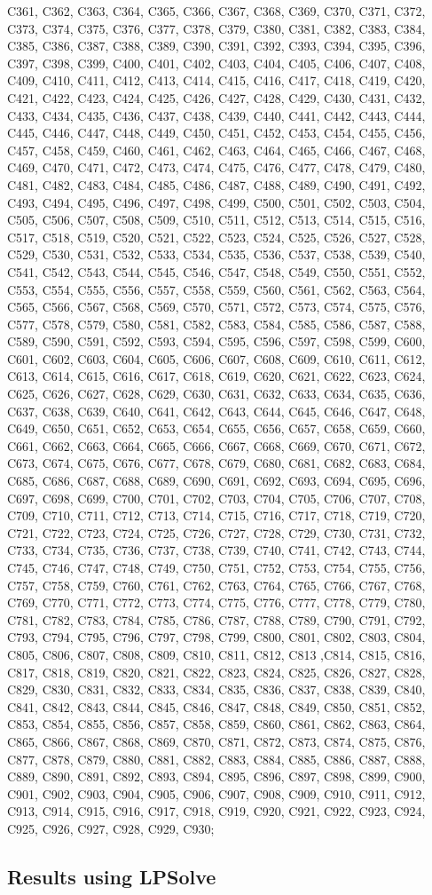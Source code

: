C361, C362, C363, C364, C365, C366, C367, C368, C369, C370, C371, C372, C373, C374, C375, C376, C377, C378, C379, C380, C381, C382, C383, C384, C385, C386, C387, C388, C389, C390, C391, C392, C393, C394, C395, C396, C397, C398, C399, C400, C401, C402, C403, C404, C405, C406, C407, C408, C409, C410, C411, C412, C413, C414, C415, C416, C417, C418, C419, C420, C421, C422, C423, C424, C425, C426, C427, C428, C429, C430, C431, C432, C433, C434, C435, C436, C437, C438, C439, C440, C441, C442, C443, C444, C445, C446, C447, C448, C449, C450, C451, C452, C453, C454, C455, C456, C457, C458, C459, C460, C461, C462, C463, C464, C465, C466, C467, C468, C469, C470, C471, C472, C473, C474, C475, C476, C477, C478, C479, C480, C481, C482, C483, C484, C485, C486, C487, C488, C489, C490, C491, C492, C493, C494, C495, C496, C497, C498, C499, C500, C501, C502, C503, C504, C505, C506, C507, C508, C509, C510, C511, C512, C513, C514, C515, C516, C517, C518, C519, C520, C521, C522, C523, C524, C525, C526, C527, C528, C529, C530, C531, C532, C533, C534, C535, C536, C537, C538, C539, C540, C541, C542, C543, C544, C545, C546, C547, C548, C549, C550, C551, C552, C553, C554, C555, C556, C557, C558, C559, C560, C561, C562, C563, C564, C565, C566, C567, C568, C569, C570, C571, C572, C573, C574, C575, C576, C577, C578, C579, C580, C581, C582, C583, C584, C585, C586, C587, C588, C589, C590, C591, C592, C593, C594, C595, C596, C597, C598, C599, C600, C601, C602, C603, C604, C605, C606, C607, C608, C609, C610, C611, C612, C613, C614, C615, C616, C617, C618, C619, C620, C621, C622, C623, C624, C625, C626, C627, C628, C629, C630, C631, C632, C633, C634, C635, C636, C637, C638, C639, C640, C641, C642, C643, C644, C645, C646, C647, C648, C649, C650, C651, C652, C653, C654, C655, C656, C657, C658, C659, C660, C661, C662, C663, C664, C665, C666, C667, C668, C669, C670, C671, C672, C673, C674, C675, C676, C677, C678, C679, C680, C681, C682, C683, C684, C685, C686, C687, C688, C689, C690, C691, C692, C693, C694, C695, C696, C697, C698, C699, C700, C701, C702, C703, C704, C705, C706, C707, C708, C709, C710, C711, C712, C713, C714, C715, C716, C717, C718, C719, C720, C721, C722, C723, C724, C725, C726, C727, C728, C729, C730, C731, C732, C733, C734, C735, C736, C737, C738, C739, C740, C741, C742, C743, C744, C745, C746, C747, C748, C749, C750, C751, C752, C753, C754, C755, C756, C757, C758, C759, C760, C761, C762, C763, C764, C765, C766, C767, C768, C769, C770, C771, C772, C773, C774, C775, C776, C777, C778, C779, C780, C781, C782, C783, C784, C785, C786, C787, C788, C789, C790, C791, C792, C793, C794, C795, C796, C797, C798, C799, C800, C801, C802, C803, C804, C805, C806, C807, C808, C809, C810, C811, C812, C813 ,C814, C815, C816, C817, C818, C819, C820, C821, C822, C823, C824, C825, C826, C827, C828, C829, C830, C831, C832, C833, C834, C835, C836, C837, C838, C839, C840, C841, C842, C843, C844, C845, C846, C847, C848, C849, C850, C851, C852, C853, C854, C855, C856, C857, C858, C859, C860, C861, C862, C863, C864, C865, C866, C867, C868, C869, C870, C871, C872, C873, C874, C875, C876, C877, C878, C879, C880, C881, C882, C883, C884, C885, C886, C887, C888, C889, C890, C891, C892, C893, C894, C895, C896, C897, C898, C899, C900, C901, C902, C903, C904, C905, C906, C907, C908, C909, C910, C911, C912, C913, C914, C915, C916, C917, C918, C919, C920, C921, C922, C923, C924, C925, C926, C927, C928, C929, C930; \\


\subsection{Results using LPSolve}
